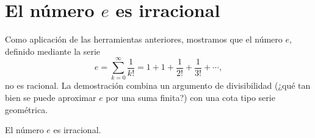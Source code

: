 \documentclass[12pt,a4paper]{book}
\begin{document}
  \section{El número \texorpdfstring{$e$}{e} es irracional}
  
  Como aplicación de las herramientas anteriores, mostramos que el número $e$, definido mediante la serie
  \begin{equation*}
    e = \sum_{k=0}^{\infty} \frac{1}{k!} = 1+1+\frac{1}{2!}+\frac{1}{3!}+\cdots,
  \end{equation*}
  no es racional. La demostración combina un argumento de divisibilidad (¿qué tan bien se puede aproximar $e$ por una suma finita?) con una cota tipo serie geométrica.
  
  \begin{teorema}[Irracionalidad de $e$]
    El número $e$ es irracional.
  \end{teorema}
  
\end{document}
